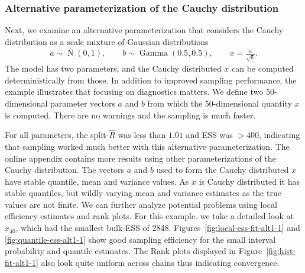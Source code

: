 \documentclass[american,]{article}
\DeclareMathOperator{\N}{N}
\DeclareMathOperator{\Gam}{Gamma}
\theoremstyle{definition}
\begin{document}
\hypertarget{alternative-parameterization-of-the-cauchy-distribution}{%
\subsubsection*{Alternative parameterization of the
Cauchy distribution}\label{alternative-parameterization-of-the-cauchy-distribution}}

Next, we examine an alternative parameterization that considers the
Cauchy distribution as a scale mixture of Gaussian distributions
\begin{align}
  a \sim  \N(0,1), \qquad
  b \sim  \Gam (0.5, 0.5), \qquad
  x =  \frac{a}{\sqrt{b}}.
\end{align}
The model has two parameters, and the Cauchy distributed \(x\) can be
computed deterministically from those. In addition to improved sampling 
performance, the example illustrates that focusing on diagnostics matters.
We define two 50-dimensional parameter vectors $a$ and $b$ from which
the 50-dimensional quantity $x$ is computed. There are no warnings and
the sampling is much faster.


For all parameters, the split-\(\widehat{R}\) was less than \(1.01\) and 
ESS was \(>400\), indicating that
sampling worked much better with this alternative parameterization.
The online appendix contains more results using other parameterizations 
of the Cauchy distribution. The vectors \(a\) and \(b\) used
to form the Cauchy distributed \(x\) have stable quantile, mean and
variance values. As \(x\) is Cauchy distributed it has stable
quantiles, but wildly varying mean and variance estimates as the true values
are not finite.
%
We can further analyze potential problems using local efficiency
estimates and rank plots. For this example. we take a detailed look at 
\(x_{40}\), which had the smallest bulk-ESS of 2848.
%
Figures~\ref{fig:local-ess-fit-alt1-1} and
\ref{fig:quantile-ess-alt1-1} show good sampling efficiency for the
small interval probability and quantile estimates.
%
The Rank plots displayed in Figure~\ref{fig:hist-fit-alt1-1} also look quite 
uniform across chains thus indicating convergence.
\end{document}
